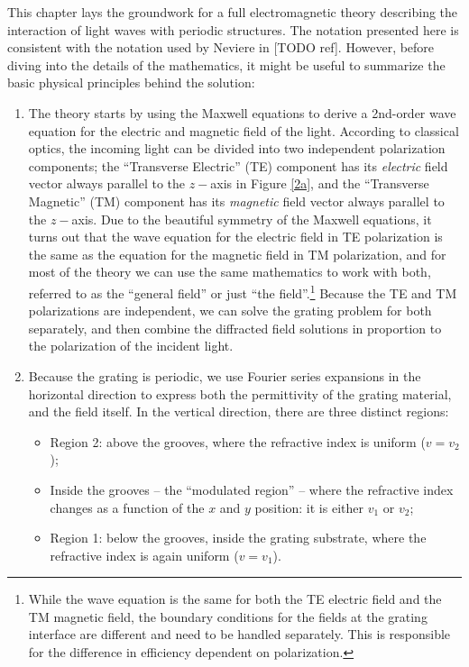 This chapter lays the groundwork for a full electromagnetic theory describing the interaction of light waves with periodic structures.  The notation presented here is consistent with the notation used by Neviere in [TODO ref].  However, before diving into the details of the mathematics, it might be useful to summarize the basic physical principles behind the solution:
  \begin{enumerate}
\item The theory starts by using the Maxwell equations to derive a 2nd-order wave equation for the electric and magnetic field of the light.  According to classical optics, the incoming light can be divided into two independent polarization components; the ``Transverse Electric'' (TE) component has its \emph{electric} field vector always parallel to the $z-$axis in Figure \ref{2a}, and the ``Transverse Magnetic'' (TM) component has its \emph{magnetic} field vector always parallel to the $z-$axis.  Due to the beautiful symmetry of the Maxwell equations, it turns out that the wave equation for the electric field in TE polarization is the same as the equation for the magnetic field in TM polarization, and for most of the theory we can use the same mathematics to work with both, referred to as the ``general field'' or just ``the field''.\footnote{While the wave equation is the same for both the TE electric field and the TM magnetic field, the boundary conditions for the fields at the grating interface are different and need to be handled separately.  This is responsible for the difference in efficiency dependent on polarization.}  Because the TE and TM polarizations are independent, we can solve the grating problem for both separately, and then combine the diffracted field solutions in proportion to the polarization of the incident light.
\item Because the grating is periodic, we use Fourier series expansions in the horizontal direction to express both the permittivity of the grating material, and the field itself. In the vertical direction, there are three distinct regions:
	\begin{itemize}
	\item Region 2: above the grooves, where the refractive index is uniform ($v = v_2$);
	\item Inside the grooves -- the ``modulated region'' -- where the refractive index changes as a function of the $x$ and $y$ position: it is either $v_1$ or $v_2$;
	\item Region 1: below the grooves, inside the grating substrate, where the refractive index is again uniform ($v=v_1$).

\end{itemize}
\end{enumerate}
